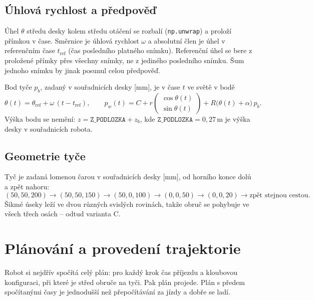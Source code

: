 \documentclass[11pt,a4paper]{article}
\begin{document}
\subsection{Úhlová rychlost a předpověď}
\label{sec:predpoved}

Úhel $\theta$ středu desky kolem středu otáčení se rozbalí (\texttt{np.unwrap}) a proloží
přímkou v čase. Směrnice je úhlová rychlost $\omega$ a absolutní člen je úhel v referenčním
čase $t_\mathrm{ref}$ (čas posledního platného snímku). Referenční úhel se bere z proložené
přímky přes všechny snímky, ne z jediného posledního snímku. Šum jednoho snímku by jinak
posunul celou předpověď.

Bod tyče $p_b$, zadaný v souřadnicích desky [mm], je v čase $t$ ve světě v bodě
\begin{equation}
  \theta(t) = \theta_\mathrm{ref} + \omega\,(t - t_\mathrm{ref}), \qquad
  p_w(t) = C + r\begin{pmatrix}\cos\theta(t)\\ \sin\theta(t)\end{pmatrix}
           + R\big(\theta(t) + \alpha\big)\,p_b .
\end{equation}
Výška bodu se nemění: $z = \texttt{Z\_PODLOZKA} + z_b$, kde $\texttt{Z\_PODLOZKA} = 0{,}27$\,m
je výška desky v souřadnicích robota.

\subsection{Geometrie tyče}
\label{sec:geometrie}

Tyč je zadaná lomenou čarou v souřadnicích desky [mm], od horního konce dolů a zpět nahoru:
\[
  (50, 50, 200) \to (50, 50, 150) \to (50, 0, 100) \to (0, 0, 50) \to (0, 0, 20)
  \to \text{zpět stejnou cestou}.
\]
Šikmé úseky leží ve dvou různých svislých rovinách, takže obruč se pohybuje ve všech třech
osách -- odtud varianta C.

\section{Plánování a provedení trajektorie}
\label{sec:plan}

Robot si nejdřív spočítá celý plán: pro každý krok čas příjezdu a kloubovou konfiguraci,
při které je střed obruče na tyči. Pak plán projede. Plán s předem spočítanými časy je
jednodušší než přepočítávání za jízdy a dobře se ladí.
\end{document}
